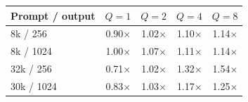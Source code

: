 \begin{tabular}{lrrrr}
\toprule
Prompt / output & $Q{=}1$ & $Q{=}2$ & $Q{=}4$ & $Q{=}8$ \\
\midrule
8k / 256 & 0.90$\times$ & 1.02$\times$ & 1.10$\times$ & 1.14$\times$ \\
8k / 1024 & 1.00$\times$ & 1.07$\times$ & 1.11$\times$ & 1.14$\times$ \\
32k / 256 & 0.71$\times$ & 1.02$\times$ & 1.32$\times$ & 1.54$\times$ \\
30k / 1024 & 0.83$\times$ & 1.03$\times$ & 1.17$\times$ & 1.25$\times$ \\
\bottomrule
\end{tabular}
